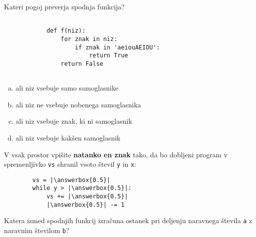 \documentclass[arhiv, 10pt]{../izpit}
\newcommand{\inlinepy}[1]{\texttt{#1}}
\newcommand{\answerbox}[1]{\framebox{\vphantom{\large M}\hspace{#1cm}}}
\begin{document}
        \naloga*

        \begin{multicols}{2}
        \noindent
        Kateri pogoj preverja spodnja funkcija?
        \begin{verbatim}
        
            def f(niz):
                for znak in niz:
                    if znak in 'aeiouAEIOU':
                        return True
                return False
            
        \end{verbatim}

        \begin{enumerate}[(a)]
\item ali niz vsebuje samo samoglasnike
\item ali niz ne vsebuje nobenega samoglasnika
\item ali niz vsebuje znak, ki ni samoglasnik
\item ali niz vsebuje kakšen samoglasnik
\end{enumerate}

        \end{multicols}
    
        \naloga*
        \begin{multicols}{2}
        \noindent
        V vsak prostor vpišite \textbf{natanko en znak} tako, da bo dobljeni program v spremenljivko \inlinepy{vs} shranil vsoto števil \inlinepy{y} in \inlinepy{x}:
        
        \columnbreak
        \begin{verbatim}
        vs = |\answerbox{0.5}|
        while y > |\answerbox{0.5}|:
            vs += |\answerbox{0.5}|
            |\answerbox{0.5}| -= 1
        \end{verbatim}
        \end{multicols}
    
        \clearpage
        \naloga
        
        Katera izmed spodnjih funkcij izračuna ostanek pri deljenju naravnega števila \inlinepy{a} z naravnim številom \inlinepy{b}?
    
\end{document}
